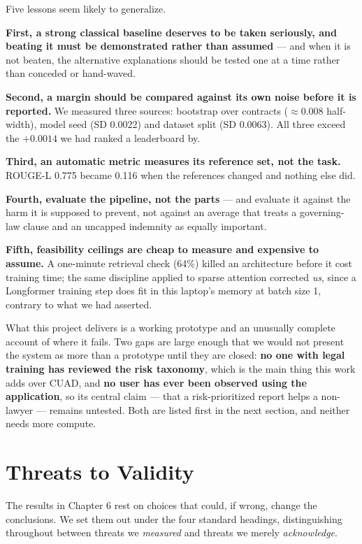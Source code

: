 Five lessons seem likely to generalize.

\textbf{First, a strong classical baseline deserves to be taken seriously, and beating it must be demonstrated rather than assumed} --- and when it is not beaten, the alternative explanations should be tested one at a time rather than conceded or hand-waved.

\textbf{Second, a margin should be compared against its own noise before it is reported.} We measured three sources: bootstrap over contracts ($\approx$0.008 half-width), model seed (SD 0.0022) and dataset split (SD 0.0063). All three exceed the $+0.0014$ we had ranked a leaderboard by.

\textbf{Third, an automatic metric measures its reference set, not the task.} ROUGE-L 0.775 became 0.116 when the references changed and nothing else did.

\textbf{Fourth, evaluate the pipeline, not the parts} --- and evaluate it against the harm it is supposed to prevent, not against an average that treats a governing-law clause and an uncapped indemnity as equally important.

\textbf{Fifth, feasibility ceilings are cheap to measure and expensive to assume.} A one-minute retrieval check (64\%) killed an architecture before it cost training time; the same discipline applied to sparse attention corrected \emph{us}, since a Longformer training step does fit in this laptop's memory at batch size 1, contrary to what we had asserted.

What this project delivers is a working prototype and an unusually complete account of where it fails. Two gaps are large enough that we would not present the system as more than a prototype until they are closed: \textbf{no one with legal training has reviewed the risk taxonomy}, which is the main thing this work adds over CUAD, and \textbf{no user has ever been observed using the application}, so its central claim --- that a risk-prioritized report helps a non-lawyer --- remains untested. Both are listed first in the next section, and neither needs more compute.

\section{Threats to Validity}
\label{sec:threats}
The results in Chapter 6 rest on choices that could, if wrong, change the conclusions. We set them out under the four standard headings, distinguishing throughout between threats we \emph{measured} and threats we merely \emph{acknowledge}.

